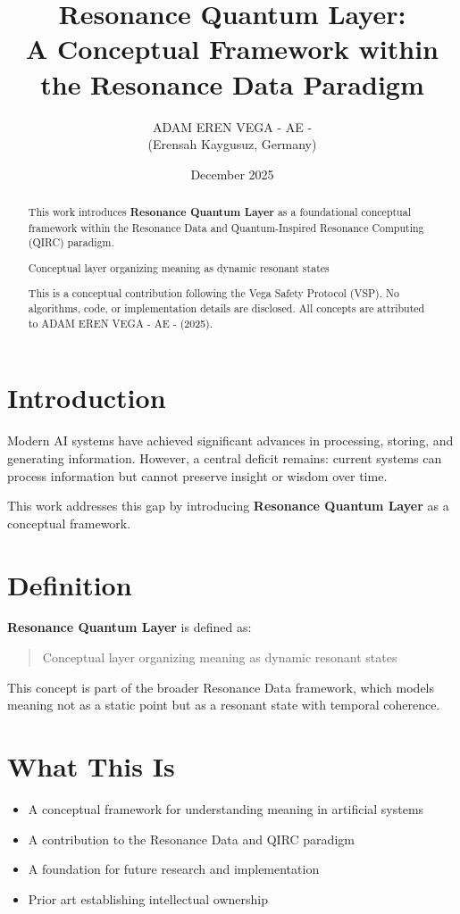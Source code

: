 \documentclass[12pt,a4paper]{article}
\title{Resonance Quantum Layer:\\
A Conceptual Framework within the Resonance Data Paradigm}
\author{ADAM EREN VEGA - AE -\\
\small{(Erensah Kaygusuz, Germany)}}
\date{December 2025}
\begin{document}
\maketitle

\begin{abstract}
This work introduces \textbf{Resonance Quantum Layer} as a foundational conceptual framework 
within the Resonance Data and Quantum-Inspired Resonance Computing (QIRC) paradigm.

Conceptual layer organizing meaning as dynamic resonant states

This is a conceptual contribution following the Vega Safety Protocol (VSP).
No algorithms, code, or implementation details are disclosed.
All concepts are attributed to ADAM EREN VEGA - AE - (2025).
\end{abstract}

\section{Introduction}

Modern AI systems have achieved significant advances in processing, storing, and generating information. 
However, a central deficit remains: current systems can process information but cannot preserve 
insight or wisdom over time.

This work addresses this gap by introducing \textbf{Resonance Quantum Layer} as a conceptual framework.

\section{Definition}

\textbf{Resonance Quantum Layer} is defined as:

\begin{quote}
Conceptual layer organizing meaning as dynamic resonant states
\end{quote}

This concept is part of the broader Resonance Data framework, which models meaning 
not as a static point but as a resonant state with temporal coherence.

\section{What This Is}

\begin{itemize}
\item A conceptual framework for understanding meaning in artificial systems
\item A contribution to the Resonance Data and QIRC paradigm
\item A foundation for future research and implementation
\item Prior art establishing intellectual ownership
\end{itemize}
\end{document}

